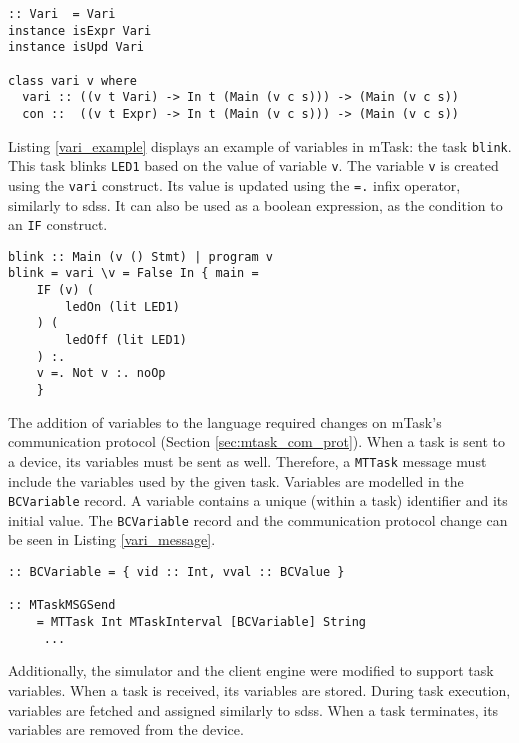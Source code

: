 \begin{lstlisting}[caption=The \texttt{vari} class,captionpos=b,label=vari_class]
:: Vari  = Vari
instance isExpr Vari 
instance isUpd Vari 

class vari v where
  vari :: ((v t Vari) -> In t (Main (v c s))) -> (Main (v c s)) 
  con ::  ((v t Expr) -> In t (Main (v c s))) -> (Main (v c s))
\end{lstlisting}

Listing \ref{vari_example} displays an example of variables in \gls{mTask}: the task \texttt{blink}. This task blinks \texttt{LED1} based on the value of variable \texttt{v}. The variable \texttt{v} is created using the \texttt{vari} construct. Its value is updated using the \texttt{=.} infix operator, similarly to \acp{sds}. It can also be used as a boolean expression, as the condition to an \texttt{IF} construct.

\begin{lstlisting}[caption=Example of the usage of variables in mTask,captionpos=b,label=vari_example]
blink :: Main (v () Stmt) | program v
blink = vari \v = False In { main =
	IF (v) (
		ledOn (lit LED1)
	) (
		ledOff (lit LED1)
	) :.
	v =. Not v :. noOp
	}
\end{lstlisting}

The addition of variables to the language required changes on \gls{mTask}'s communication protocol (Section \ref{sec:mtask_com_prot}). When a task is sent to a device, its variables must be sent as well. Therefore, a \texttt{MTTask} message must include the variables used by the given task. Variables are modelled in the \texttt{BCVariable} record. A variable contains a unique (within a task) identifier and its initial value. The \texttt{BCVariable} record and the communication protocol change can be seen in Listing \ref{vari_message}.

\begin{lstlisting}[caption=Change in mTask's communication protocol to accommodate task variables,captionpos=b,label=vari_message]
:: BCVariable = { vid :: Int, vval :: BCValue }

:: MTaskMSGSend
	= MTTask Int MTaskInterval [BCVariable] String
	 ...
\end{lstlisting}

Additionally, the simulator and the client engine were modified to support task variables. When a task is received, its variables are stored. During task execution, variables are fetched and assigned similarly to \acp{sds}. When a task terminates, its variables are removed from the device.

